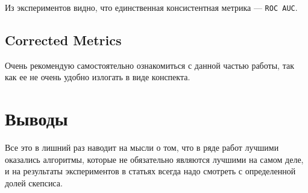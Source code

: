 Из экспериментов видно, что единственная консистентная метрика --- \texttt{ROC AUC}.

\subsection{Corrected Metrics}

Очень рекомендую самостоятельно ознакомиться с данной частью работы, так как ее не очень удобно излогать в виде конспекта.

\section{Выводы}


Все это в лишний раз наводит на мысли о том, что в ряде работ лучшими оказались алгоритмы, которые не обязательно являются лучшими на самом деле, и на результаты экспериментов в статьях всегда надо смотреть с определенной долей скепсиса.